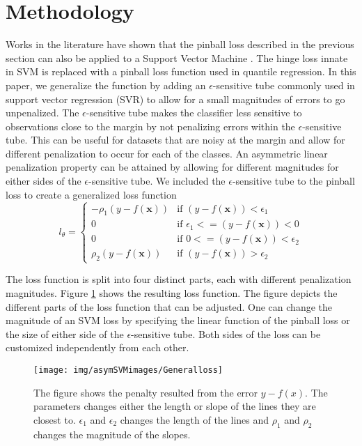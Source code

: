 \documentclass[twoside,11pt]{article}
\begin{document}
\section{Methodology}\label{generalform}
Works in the literature have shown that the pinball loss described in the previous section can also be applied to a Support Vector Machine \citep{Quadrianto09}. The hinge loss innate in SVM is replaced with a pinball loss function used in quantile regression. In this paper, we generalize the function by adding an $\epsilon$-sensitive tube commonly used in support vector regression (SVR) to allow for a small magnitudes of errors to go unpenalized. The $\epsilon$-sensitive tube makes the classifier less sensitive to observations close to the margin by not penalizing errors within the $\epsilon$-sensitive tube. This can be useful for datasets that are noisy at the margin and allow for different penalization to occur for each of the classes. An asymmetric linear penalization property can be attained by allowing for different magnitudes for either sides of the $\epsilon$-sensitive tube. We included the $\epsilon$-sensitive tube to the pinball loss to create a generalized loss function 
\begin{equation}\label{Eq:GenerallossEqn}
l_{\theta}=\begin{cases} 
	-\rho_1(y-f(\mathbf{x})) & \text{if $(y-f(\mathbf{x}))< \epsilon_1$} \\
 0  &\text{if $\epsilon_1<=(y-f(\mathbf{x}))< 0$} \\
 0  &\text{if $0<=(y-f(\mathbf{x}))< \epsilon_2$} \\
 \rho_2(y-f(\mathbf{x})) &\text{if $(y-f(\mathbf{x}))>\epsilon_2$}
\end{cases}
\end{equation}

The loss function is split into four distinct parts, each with different penalization magnitudes. Figure \ref{Fig:General Loss} shows the resulting loss function. The figure depicts the different parts of the loss function that can be adjusted. One can change the magnitude of an SVM loss by specifying the linear function of the pinball loss or the size of either side of the $\epsilon$-sensitive tube. Both sides of the loss can be customized independently from each other.
\begin{figure}
 \centering
\texttt{[image: img/asymSVMimages/Generalloss]}\\
 \caption{The figure shows the penalty resulted from the error $y-f(x)$. The parameters changes either the length or slope of the lines they are closest to. $\epsilon_1$ and $\epsilon_2$ changes the length of the lines and $\rho_1$ and $\rho_2$ changes the magnitude of the slopes.}
 \label{Fig:General Loss}
\end{figure}
\end{document}
